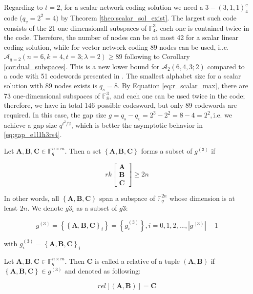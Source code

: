 Regarding to $t=2$, for a scalar network coding solution we need
a $3-\left(3,1,1\right)_{4}^{c}$ code ($q_{v}=2^{2}=4)$ by Theorem
\ref{theo:scalar_sol_exist}. The largest such code consists of the
21 one-dimensionall subspaces of $\ensuremath{\mathbb{F}}_{4}^{3}$,
each one is contained twice in the code. Therefore, the number of
nodes can be at most 42 for a scalar linear coding solution, while
for vector network coding 89 nodes can be used, i..e. $\mathcal{A}_{q=2}\left(n=6,k=4,t=3;\lambda=2\right)\geq89$
following to Corollary \ref{cor:dual_subspaces}. This is a new lower
bound for $\mathcal{A}_{2}\left(6,4,3;2\right)$ compared to a code
with 51 codewords presented in \cite{Wachter-Zeh:2018}. The smallest
alphabet size for a scalar solution with 89 nodes exists is $q_{s}=8$.
By Equation \ref{eq:r_scalar_max}, there are 73 one-dimensional subspaces
of $\ensuremath{\mathbb{F}}_{8}^{3}$, and each one can be used twice
in the code; therefore, we have in total 146 possible codesword, but
only 89 codewords are required. In this case, the gap size $g=q_{s}-q_{v}=2^{3}-2^{2}=8-4=2^{2},$i.e.
we achieve a gap size $q^{t^{2}/2}$, which is better the asymptotic
behavior in \ref{eq:gap_e1l1h3rs4}.
\begin{defn}
 Let $\boldsymbol{A},\boldsymbol{B},\boldsymbol{C}\in\ensuremath{\mathbb{F}}_{q}^{n\times m}$.
Then a set $\left\{ \boldsymbol{A},\boldsymbol{B},\boldsymbol{C}\right\} $
forms a subset of $g^{\left(3\right)}$ if

\[
rk\left[\begin{array}{c}
\boldsymbol{A}\\
\boldsymbol{B}\\
\boldsymbol{C}
\end{array}\right]\geq2n
\]

In other words, all $\left\{ \boldsymbol{A},\boldsymbol{B},\boldsymbol{C}\right\} $
span a subspace of $\ensuremath{\mathbb{F}}_{q}^{2n}$ whose dimension
is at least $2n$. We denote $g3_{i}$ as a subset of $g3$:

\[
g^{\left(3\right)}=\left\{ \left\{ \boldsymbol{A},\boldsymbol{B},\boldsymbol{C}\right\} _{i}\right\} =\left\{ g_{i}^{\left(3\right)}\right\} ,i=0,1,2,...,\left|g^{\left(3\right)}\right|-1
\]

with $g_{i}^{\left(3\right)}=\left\{ \boldsymbol{A},\boldsymbol{B},\boldsymbol{C}\right\} _{i}$
\end{defn}
%
\begin{defn}[Relative]
 Let $\boldsymbol{A},\boldsymbol{B},\boldsymbol{C}\in\ensuremath{\mathbb{F}}_{q}^{n\times m}$.
Then $\boldsymbol{C}$ is called a relative of a tuple $\left(\boldsymbol{A},\boldsymbol{B}\right)$
if $\left\{ \boldsymbol{A},\boldsymbol{B},\boldsymbol{C}\right\} \in g^{\left(3\right)}$
and denoted as following:

\[
rel\left[\left(\boldsymbol{A},\boldsymbol{B}\right)\right]=\boldsymbol{C}
\]
\end{defn}
